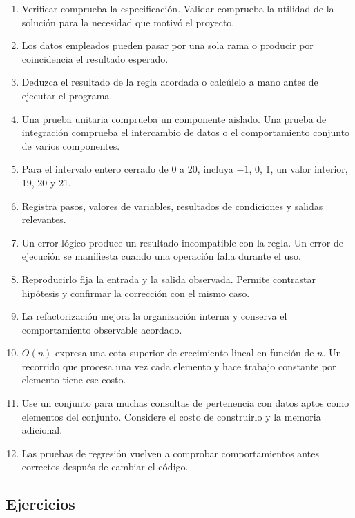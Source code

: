 \begin{enumerate}
\item Verificar comprueba la especificación. Validar comprueba la utilidad de la solución para la necesidad que motivó el proyecto.
\item Los datos empleados pueden pasar por una sola rama o producir por coincidencia el resultado esperado.
\item Deduzca el resultado de la regla acordada o calcúlelo a mano antes de ejecutar el programa.
\item Una prueba unitaria comprueba un componente aislado. Una prueba de integración comprueba el intercambio de datos o el comportamiento conjunto de varios componentes.
\item Para el intervalo entero cerrado de 0 a 20, incluya \(-1\), 0, 1, un valor interior, 19, 20 y 21.
\item Registra pasos, valores de variables, resultados de condiciones y salidas relevantes.
\item Un error lógico produce un resultado incompatible con la regla. Un error de ejecución se manifiesta cuando una operación falla durante el uso.
\item Reproducirlo fija la entrada y la salida observada. Permite contrastar hipótesis y confirmar la corrección con el mismo caso.
\item La refactorización mejora la organización interna y conserva el comportamiento observable acordado.
\item \(O(n)\) expresa una cota superior de crecimiento lineal en función de \(n\). Un recorrido que procesa una vez cada elemento y hace trabajo constante por elemento tiene ese costo.
\item Use un conjunto para muchas consultas de pertenencia con datos aptos como elementos del conjunto. Considere el costo de construirlo y la memoria adicional.
\item Las pruebas de regresión vuelven a comprobar comportamientos antes correctos después de cambiar el código.
\end{enumerate}

\subsection{Ejercicios}

